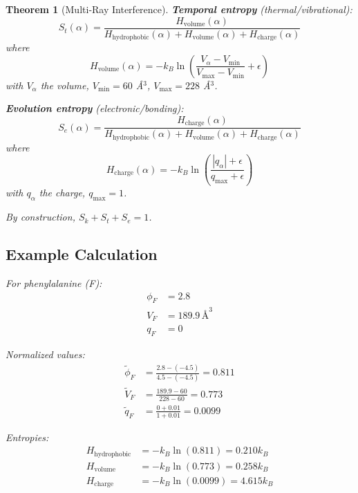 \documentclass[11pt,a4paper]{article}
\newtheorem{theorem}{Theorem}[section]
\begin{document}
\begin{theorem}[Multi-Ray Interference]
\textbf{Temporal entropy} (thermal/vibrational):
\begin{equation}
S_t(\alpha) = \frac{H_{\text{volume}}(\alpha)}{H_{\text{hydrophobic}}(\alpha) + H_{\text{volume}}(\alpha) + H_{\text{charge}}(\alpha)}
\end{equation}
where
\begin{equation}
H_{\text{volume}}(\alpha) = -k_B \ln\left(\frac{V_{\alpha} - V_{\min}}{V_{\max} - V_{\min}} + \epsilon\right)
\end{equation}
with $V_\alpha$ the volume, $V_{\min} = 60$ \AA$^3$, $V_{\max} = 228$ \AA$^3$.

\textbf{Evolution entropy} (electronic/bonding):
\begin{equation}
S_e(\alpha) = \frac{H_{\text{charge}}(\alpha)}{H_{\text{hydrophobic}}(\alpha) + H_{\text{volume}}(\alpha) + H_{\text{charge}}(\alpha)}
\end{equation}
where
\begin{equation}
H_{\text{charge}}(\alpha) = -k_B \ln\left(\frac{|q_{\alpha}| + \epsilon}{q_{\max} + \epsilon}\right)
\end{equation}
with $q_\alpha$ the charge, $q_{\max} = 1$.

By construction, $S_k + S_t + S_e = 1$.

\subsection{Example Calculation}

For phenylalanine (F):
\begin{align}
\phi_F &= 2.8 \\
V_F &= 189.9 \, \text{\AA}^3 \\
q_F &= 0
\end{align}

Normalized values:
\begin{align}
\tilde{\phi}_F &= \frac{2.8 - (-4.5)}{4.5 - (-4.5)} = 0.811 \\
\tilde{V}_F &= \frac{189.9 - 60}{228 - 60} = 0.773 \\
\tilde{q}_F &= \frac{0 + 0.01}{1 + 0.01} = 0.0099
\end{align}

Entropies:
\begin{align}
H_{\text{hydrophobic}} &= -k_B \ln(0.811) = 0.210 k_B \\
H_{\text{volume}} &= -k_B \ln(0.773) = 0.258 k_B \\
H_{\text{charge}} &= -k_B \ln(0.0099) = 4.615 k_B
\end{align}


\end{theorem}
\end{document}
